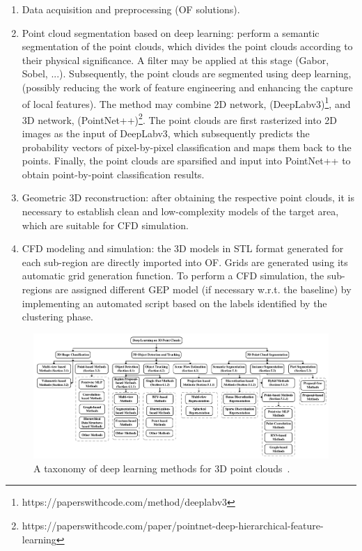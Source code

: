 \begin{enumerate}
    \item Data acquisition and preprocessing (OF solutions).
    \item Point cloud segmentation based on deep learning: perform a semantic segmentation of the point clouds, which divides the point clouds according to their physical significance. A filter may be applied at this stage (Gabor, Sobel, ...). Subsequently, the point clouds are segmented using deep learning, (possibly reducing the work of feature engineering and enhancing the capture of local features). The method may combine 2D network, (DeepLabv3)\footnote{https://paperswithcode.com/method/deeplabv3}, and 3D network, (PointNet++)\footnote{https://paperswithcode.com/paper/pointnet-deep-hierarchical-feature-learning}. The point clouds are first rasterized into 2D images as the input of DeepLabv3, which subsequently predicts the probability vectors of pixel-by-pixel classification and maps them back to the points. Finally, the point clouds are sparsified and input into PointNet++ to obtain point-by-point classification results.
    \item Geometric 3D reconstruction: after obtaining the respective point clouds, it is necessary to establish clean and low-complexity models of the target area, which are suitable for CFD simulation.
    \item CFD modeling and simulation: the 3D models in STL format generated for each sub-region are directly imported into OF. Grids are generated using its automatic grid generation function. To perform a CFD simulation, the sub-regions are assigned different GEP model (if necessary w.r.t. the baseline) by implementing an automated script based on the labels identified by the clustering phase.
\end{enumerate}

\begin{figure}
    \centering
    \includegraphics[width=1.0\textwidth]{figs/taxonomy.png}
    \caption{A taxonomy of deep learning methods for 3D point clouds~\cite{guo2020deep}.}
    \label{fig:taxo}%
\end{figure}

